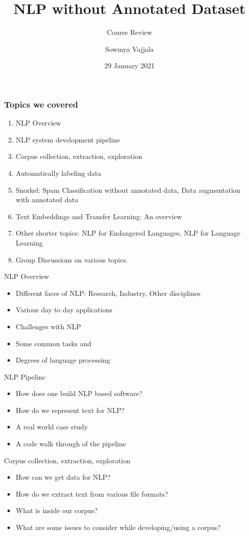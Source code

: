 \documentclass{beamer}
\author[Sowmya Vajjala]{Sowmya Vajjala}
\title[SfSNLP]{NLP without Annotated Dataset}
\subtitle{Course Review}
\date{29 January 2021}
\institute{Seminar f\"ur Sprachwissenschaft, University of T\"ubingen, Germany}
\begin{document}
\begin{frame}\titlepage
\end{frame}

\begin{frame}
\frametitle{Topics we covered}
\begin{enumerate}
\item NLP Overview
\item NLP system development pipeline
\item Corpus collection, extraction, exploration 
\item Automatically labeling data
\item Snorkel: Spam Classification without annotated data, Data augmentation with annotated data
\item Text Embeddings and Transfer Learning: An overview
\item Other shorter topics: NLP for Endangered Languages, NLP for Language Learning
\item Group Discussions on various topics. 
\end{enumerate}
\end{frame}

\begin{frame}{NLP Overview}
    \begin{itemize}
        \item Different faces of NLP: Research, Industry, Other disciplines
        \item Various day to day applications
        \item Challenges with NLP
        \item Some common tasks and
        \item Degrees of language processing
    \end{itemize}
\end{frame}

\begin{frame}{NLP Pipeline}
    \begin{itemize}
        \item How does one build NLP based software?
        \item How do we represent text for NLP?
        \item A real world case study
        \item A code walk through of the pipeline
    \end{itemize}
\end{frame}

\begin{frame}{Corpus collection, extraction, exploration}
    \begin{itemize}
        \item How can we get data for NLP?
        \item How do we extract text from various file formats?
        \item What is inside our corpus?
        \item What are some issues to consider while developing/using a corpus?
    \end{itemize}
\end{frame}
\end{document}
